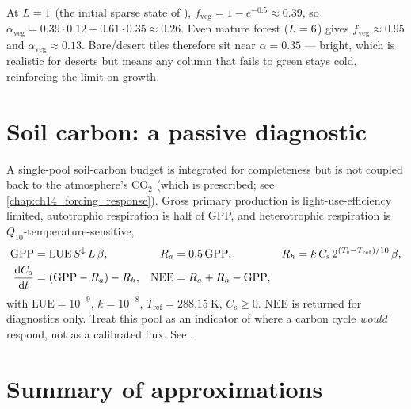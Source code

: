 \begin{example}
At $L=1$ (the initial sparse state of ),
$f_{\mathrm{veg}}=1-e^{-0.5}\approx0.39$, so
$\alpha_{\mathrm{veg}}=0.39\cdot0.12+0.61\cdot0.35\approx0.26$. Even mature
forest ($L=6$) gives $f_{\mathrm{veg}}\approx0.95$ and
$\alpha_{\mathrm{veg}}\approx0.13$. Bare/desert tiles therefore sit near
$\alpha=0.35$ --- bright, which is realistic for deserts but means any column
that fails to green stays cold, reinforcing the limit on growth.
\end{example}

\section{Soil carbon: a passive diagnostic}

A single-pool soil-carbon budget is integrated for completeness but is not
coupled back to the atmosphere's $\mathrm{CO_2}$ (which is prescribed; see
\ref{chap:ch14_forcing_response}). Gross primary production is light-use-efficiency
limited, autotrophic respiration is half of GPP, and heterotrophic respiration
is $Q_{10}$-temperature-sensitive,
\begin{align}
  \mathrm{GPP} &= \mathrm{LUE}\,S^\downarrow\,L\,\beta, &
  R_a &= 0.5\,\mathrm{GPP}, &
  R_h &= k\,C_{\mathrm s}\,2^{(T_{\mathrm s}-T_{\mathrm{ref}})/10}\,\beta, \\
  \frac{\mathrm{d}C_{\mathrm s}}{\mathrm{d}t} &= (\mathrm{GPP}-R_a) - R_h, &
  \mathrm{NEE} &= R_a + R_h - \mathrm{GPP},
\end{align}
with $\mathrm{LUE}=10^{-9}$, $k=10^{-8}$, $T_{\mathrm{ref}}=288.15\ \mathrm{K}$,
$C_{\mathrm s}\ge 0$. NEE is returned for diagnostics only. Treat this pool as
an indicator of where a carbon cycle \emph{would} respond, not as a calibrated
flux. See .

\section{Summary of approximations}

